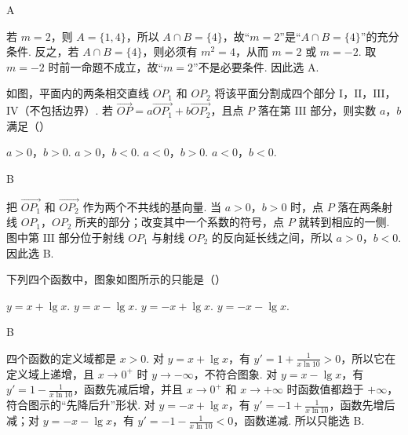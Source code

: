\begin{answer}
A
\end{answer}

\begin{solution}
若 \(m=2\)，则 \(A=\{1,4\}\)，所以 \(A\cap B=\{4\}\)，故“\(m=2\)”是“\(A\cap B=\{4\}\)”的充分条件. 反之，若 \(A\cap B=\{4\}\)，则必须有 \(m^2=4\)，从而 \(m=2\) 或 \(m=-2\). 取 \(m=-2\) 时前一命题不成立，故“\(m=2\)”不是必要条件. 因此选 A.
\end{solution}

\begin{problem}
如图，平面内的两条相交直线 \(OP_1\) 和 \(OP_2\) 将该平面分割成四个部分 \(\mathrm{I}\)，\(\mathrm{II}\)，\(\mathrm{III}\)，\(\mathrm{IV}\)（不包括边界）. 若 \(\overrightarrow{OP}=a\overrightarrow{OP_1}+b\overrightarrow{OP_2}\)，且点 \(P\) 落在第 \(\mathrm{III}\) 部分，则实数 \(a\)，\(b\) 满足（\quad）


\choices
    {\(a>0\)，\(b>0\).}
    {\(a>0\)，\(b<0\).}
    {\(a<0\)，\(b>0\).}
    {\(a<0\)，\(b<0\).}
\end{problem}

\begin{answer}
B
\end{answer}

\begin{solution}
把 \(\overrightarrow{OP_1}\) 和 \(\overrightarrow{OP_2}\) 作为两个不共线的基向量. 当 \(a>0\)，\(b>0\) 时，点 \(P\) 落在两条射线 \(OP_1\)，\(OP_2\) 所夹的部分；改变其中一个系数的符号，点 \(P\) 就转到相应的一侧. 图中第 \(\mathrm{III}\) 部分位于射线 \(OP_1\) 与射线 \(OP_2\) 的反向延长线之间，所以 \(a>0\)，\(b<0\). 因此选 B.
\end{solution}

\begin{problem}
下列四个函数中，图象如图所示的只能是（\quad）


\choices
    {\(y=x+\lg x\).}
    {\(y=x-\lg x\).}
    {\(y=-x+\lg x\).}
    {\(y=-x-\lg x\).}
\end{problem}

\begin{answer}
B
\end{answer}

\begin{solution}
四个函数的定义域都是 \(x>0\). 对 \(y=x+\lg x\)，有 \(y'=1+\frac{1}{x\ln10}>0\)，所以它在定义域上递增，且 \(x\to0^+\) 时 \(y\to-\infty\)，不符合图象. 对 \(y=x-\lg x\)，有 \(y'=1-\frac{1}{x\ln10}\)，函数先减后增，并且 \(x\to0^+\) 和 \(x\to+\infty\) 时函数值都趋于 \(+\infty\)，符合图示的“先降后升”形状. 对 \(y=-x+\lg x\)，有 \(y'=-1+\frac{1}{x\ln10}\)，函数先增后减；对 \(y=-x-\lg x\)，有 \(y'=-1-\frac{1}{x\ln10}<0\)，函数递减. 所以只能选 B.
\end{solution}

